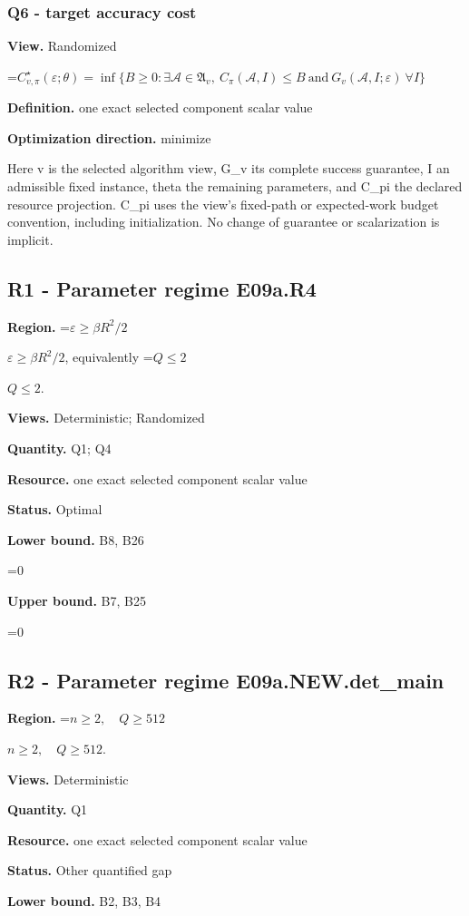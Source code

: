 \documentclass[10pt,a4paper]{article}
\newcommand{\AtlasMath}[1]{\par\begingroup\centering\setbox0=\hbox{$\displaystyle #1$}\ifdim\wd0>1.4\linewidth\typeout{ATLAS WIDE FORMULA: \the\wd0}\fi\ifdim\wd0>\linewidth\resizebox{\linewidth}{!}{\box0}\else\box0\fi\par\endgroup}
\newcommand{\AtlasInlineMath}[1]{\begingroup\setbox0=\hbox{$#1$}\ifdim\wd0>.4\linewidth\endgroup\AtlasMath{#1}\else\endgroup$#1$\fi}
\begin{document}
\subsubsection{Q6 - target accuracy cost}
\textbf{View.} Randomized

\AtlasMath{C^\star_{v,\pi}(\varepsilon;\theta)=\inf\{B\ge0:\exists\mathcal A\in\mathfrak A_v,\ C_\pi(\mathcal A,I)\le B\ \text{and}\ G_v(\mathcal A,I;\varepsilon)\ \forall I\}}
\textbf{Definition.} one exact selected component scalar value

\textbf{Optimization direction.} minimize

Here v is the selected algorithm view, G\_v its complete success guarantee, I an admissible fixed instance, theta the remaining parameters, and C\_pi the declared resource projection. C\_pi uses the view's fixed-path or expected-work budget convention, including initialization. No change of guarantee or scalarization is implicit.

\subsection{R1 - Parameter regime E09a.R4}
\textbf{Region.} \AtlasInlineMath{\varepsilon\ge\beta R^2/2}, equivalently \AtlasInlineMath{Q\le2}.

\textbf{Views.} Deterministic; Randomized

\textbf{Quantity.} Q1; Q4

\textbf{Resource.} one exact selected component scalar value

\textbf{Status.} Optimal

\textbf{Lower bound.} B8, B26

\AtlasMath{0}
\textbf{Upper bound.} B7, B25

\AtlasMath{0}
\subsection{R2 - Parameter regime E09a.NEW.det\_main}
\textbf{Region.} \AtlasInlineMath{n\ge 2,\quad Q\ge512}.

\textbf{Views.} Deterministic

\textbf{Quantity.} Q1

\textbf{Resource.} one exact selected component scalar value

\textbf{Status.} Other quantified gap

\textbf{Lower bound.} B2, B3, B4
\end{document}
